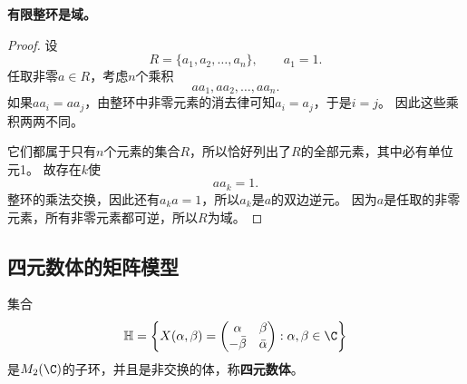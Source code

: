 \begin{theorem}
\textbf{有限整环是域。}
\end{theorem}
\begin{proof}
设
\[
R=\{a_1,a_2,\ldots,a_n\},\qquad a_1=1.
\]
任取非零$a\in R$，考虑$n$个乘积
\[
aa_1,aa_2,\ldots,aa_n.
\]
如果$aa_i=aa_j$，由整环中非零元素的消去律可知$a_i=a_j$，于是$i=j$。
因此这些乘积两两不同。

它们都属于只有$n$个元素的集合$R$，所以恰好列出了$R$的全部元素，其中必有单位元1。
故存在$k$使
\[
aa_k=1.
\]
整环的乘法交换，因此还有$a_ka=1$，所以$a_k$是$a$的双边逆元。
因为$a$是任取的非零元素，所有非零元素都可逆，所以$R$为域。
\end{proof}

\subsection*{四元数体的矩阵模型}
\begin{proposition}
集合
\[
\mathbb H=\left\{X(\alpha,\beta)=
\begin{pmatrix}\alpha&\beta\\-\bar\beta&\bar\alpha\end{pmatrix}:
\alpha,\beta\in\C\right\}
\]
是$M_2(\C)$的子环，并且是非交换的体，称\textbf{四元数体}。
\end{proposition}
